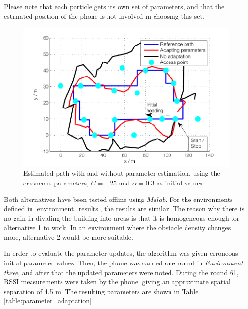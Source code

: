 \documentclass{LTHthesis}
\begin{document}
Please note that each particle gets its own set of parameters, and that the estimated position of the phone is not involved in choosing this set.
%
\begin{figure}[!hbt]

\includegraphics[width=1\textwidth ]{images/adapt_parameters/adaptation_vs_none}
\caption{Estimated path with and without parameter estimation, using the erroneous parameters, $C=-25$ and $\alpha=0.3$ as initial values.}
\label{adaptation_vs_none}
\end{figure}
%
Both alternatives have been tested offline using $Malab$. For the environments defined in \ref{environment_results}, the results are similar. The reason why there is no gain in dividing the building into areas is that it is homogeneous enough for alternative 1 to work. In an environment where the obstacle density changes more, alternative 2 would be more suitable.

In order to evaluate the parameter updates, the algorithm was given erroneous initial parameter values. Then, the phone was carried one round in \emph{Environment three}, and after that the updated parameters were noted. During the round 61, RSSI measurements were taken by the phone, giving an approximate spatial separation of 4.5 m. The resulting parameters are shown in Table \ref{table:parameter_adaptation}
\end{document}
